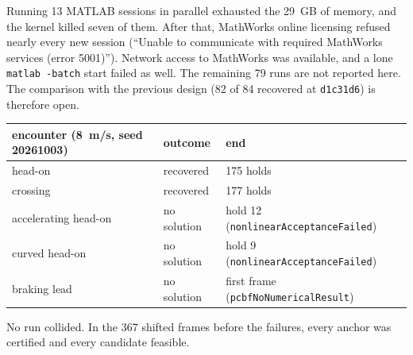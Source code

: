 \documentclass[11pt]{article}
\begin{document}
Running 13 MATLAB sessions in parallel exhausted the 29~GB of memory, and the
kernel killed seven of them. After that, MathWorks online licensing refused
nearly every new session (``Unable to communicate with required MathWorks
services (error 5001)''). Network access to MathWorks was available, and a
lone \texttt{matlab -batch} start failed as well. The remaining 79 runs are
not reported here. The comparison with the previous design (82 of 84
recovered at \texttt{d1c31d6}) is therefore open.

\begin{center}
\begin{tabular}{lll}
\toprule
encounter (8~m/s, seed 20261003) & outcome & end\\
\midrule
head-on & recovered & 175 holds\\
crossing & recovered & 177 holds\\
accelerating head-on & no solution & hold 12 (\texttt{nonlinearAcceptanceFailed})\\
curved head-on & no solution & hold 9 (\texttt{nonlinearAcceptanceFailed})\\
braking lead & no solution & first frame (\texttt{pcbfNoNumericalResult})\\
\bottomrule
\end{tabular}
\end{center}
No run collided. In the 367 shifted frames before the failures, every anchor
was certified and every candidate feasible.
\end{document}

